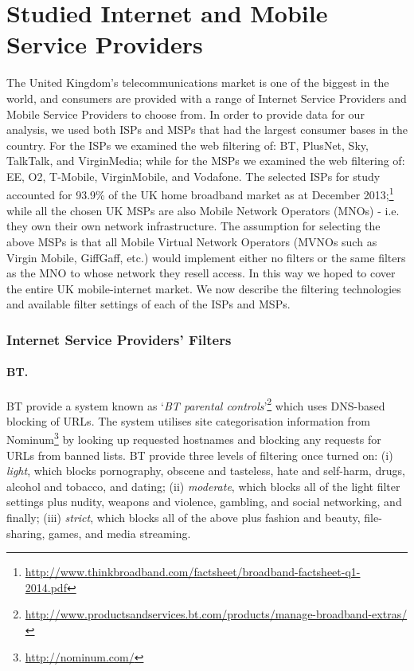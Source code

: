 \documentclass{bmcart}
\begin{document}
\section*{Studied Internet and Mobile Service Providers}
The United Kingdom's telecommunications market is one of the biggest in the world, and consumers are provided with a range of Internet Service Providers and Mobile Service Providers to choose from.
In order to provide data for our analysis, we used both ISPs and MSPs that had the largest consumer bases in the country.
For the ISPs we examined the web filtering of: BT, PlusNet, Sky, TalkTalk, and VirginMedia; while for the MSPs we examined the web filtering of: EE, O2, T-Mobile, VirginMobile, and Vodafone.
The selected ISPs for study accounted for 93.9\% of the UK home broadband market as at December 2013;\footnote{\url{http://www.thinkbroadband.com/factsheet/broadband-factsheet-q1-2014.pdf}} while all the chosen UK MSPs are also Mobile Network Operators (MNOs) - i.e. they own their own network infrastructure.
The assumption for selecting the above MSPs is that all Mobile Virtual Network Operators (MVNOs such as Virgin Mobile, GiffGaff, etc.) would implement either no filters or the same filters as the MNO to whose network they resell access. In this way we hoped to cover the entire UK mobile-internet market. 
We now describe the filtering technologies and available filter settings of each of the ISPs and MSPs.

\subsubsection*{Internet Service Providers' Filters}
\paragraph{BT.}
BT provide a system known as `\textit{BT parental controls}'\footnote{\url{http://www.productsandservices.bt.com/products/manage-broadband-extras/}} which uses DNS-based blocking of URLs.
The system utilises site categorisation information from Nominum\footnote{\url{http://nominum.com/}} by looking up requested hostnames and blocking any requests for URLs from banned lists.
BT provide three levels of filtering once turned on: (i) \textit{light}, which blocks pornography, obscene and tasteless, hate and self-harm, drugs, alcohol and tobacco, and dating; (ii) \textit{moderate}, which blocks all of the light filter settings plus nudity, weapons and violence, gambling, and social networking, and finally; (iii) \textit{strict}, which blocks all of the above plus fashion and beauty, file-sharing, games, and media streaming.
\end{document}
